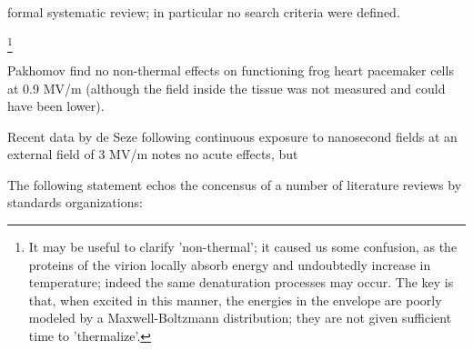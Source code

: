 \documentclass[paper.tex]{subfiles}
\begin{document}
\begin{multicols}{1}
formal systematic review; in particular no search criteria were defined.

%
\footnote{It may be useful to clarify 'non-thermal'; it caused us some confusion, as the proteins of the virion locally absorb energy and undoubtedly increase in temperature; indeed the same denaturation processes may occur. The key is that, when excited in this manner, the energies in the envelope are poorly modeled by a Maxwell-Boltzmann distribution; they are not given sufficient time to 'thermalize'.} 
%




%
%
%
%
%
%
%
%
%
%
%



Pakhomov \cite{Comparative} find no non-thermal effects on functioning frog heart pacemaker cells at 0.9 MV/m (although the field inside the tissue was not measured and could have been lower). 

Recent data by de Seze following continuous exposure to nanosecond fields at an external field of 3 MV/m \cite{Repeated2020} notes no acute effects, but 

The following statement echos the concensus of a number of literature reviews by standards organizations:


\end{multicols}
\end{document}
